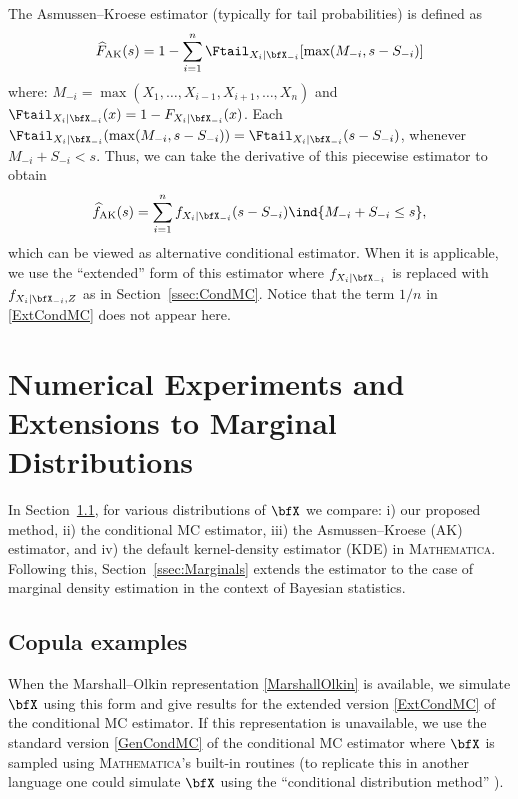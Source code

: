 The Asmussen--Kroese estimator \cite{asmussen2006improved} (typically for tail probabilities) is defined as
\[
\widehat{F}_{\mathrm{AK}}(s) = 1 - \sum_{i=1}^n
\Ftail_{X_i | \bfX_{-i}}[ \max( M_{-i}, s - S_{-i} ) ] \]
where: $M_{-i} = \max( X_1,\ldots,X_{i-1},X_{i+1},\ldots,X_n )$  and  $\Ftail_{X_i | \bfX_{-i}}(x)=1-F_{X_i | \bfX_{-i}}(x)$.
Each $\Ftail_{X_i | \bfX_{-i}}( \max( M_{-i}, s - S_{-i} ) )=
\Ftail_{X_i | \bfX_{-i}}( s - S_{-i})$,
whenever $M_{-i}+S_{-i}<s$. Thus,
we can take the derivative of this  piecewise  estimator to obtain
\[
\widehat{f}_{\mathrm{AK}}(s) = \sum_{i=1}^n
f_{X_i | \bfX_{-i}}( s - S_{-i} ) \ind{M_{-i} + S_{-i} \le s }, \]
which can be viewed as alternative conditional estimator.
When it is applicable, we use the ``extended'' form of this estimator where $f_{X_i | \bfX_{-i}}$ is replaced with $f_{X_i | \bfX_{-i}, Z}$ as in Section~\ref{ssec:CondMC}. Notice that the term  $1/n$ in \eqref{ExtCondMC} does not appear here.

\section{Numerical Experiments and Extensions to Marginal Distributions} \label{sec:NumericalResults}

In Section~\ref{ssec:CopulaExamples}, for various distributions of $\bfX$ we compare: i) our proposed method, ii) the conditional MC estimator, iii) the Asmussen--Kroese (AK) estimator, and iv) the default kernel-density estimator (KDE) in \textsc{Mathematica}. Following this, Section~\ref{ssec:Marginals} extends the estimator to the case of marginal density estimation in the context of Bayesian statistics.

\subsection{Copula examples} \label{ssec:CopulaExamples}

When the Marshall--Olkin representation \eqref{MarshallOlkin} is available, we simulate $\bfX$ using this form and give results for the extended version \eqref{ExtCondMC} of the conditional MC estimator. If this representation is unavailable, we use the standard version \eqref{GenCondMC} of the conditional MC estimator where $\bfX$ is sampled using \textsc{Mathematica}'s built-in routines (to replicate this in another language one could simulate $\bfX$ using the  ``conditional distribution method'' \cite[p.~41]{nelsen2006introduction}).


